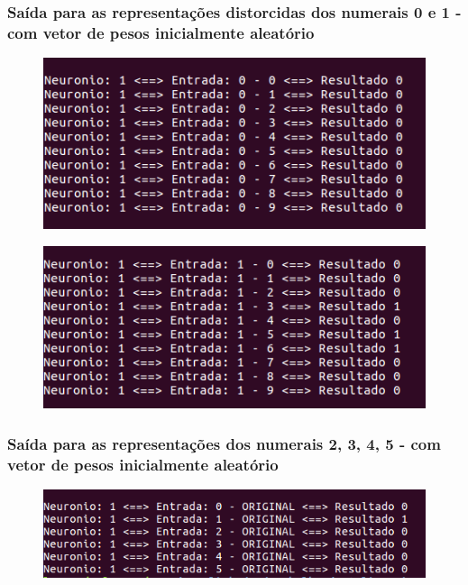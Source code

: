 \documentclass[hidelinks,12pt]{article}
\begin{document}
		\newpage
		
		\subsubsection{Saída para as representações distorcidas dos numerais 0 e 1 - com vetor de pesos inicialmente aleatório}
		
		\begin{figure}[!h]
			\centering
			\includegraphics[scale=0.7]{Figures/E1S0R.png}
		\end{figure}
		
		\begin{figure}[!h]
			\centering
			\includegraphics[scale=0.7]{Figures/E1S1R.png}
		\end{figure}
		
		\newpage
		
		\subsubsection{Saída para as representações dos numerais 2, 3, 4, 5 - com vetor de pesos inicialmente aleatório}
		
		\begin{figure}[!h]
			\centering
			\includegraphics[scale=0.7]{Figures/E1SALLR.png}
		\end{figure}
\end{document}
